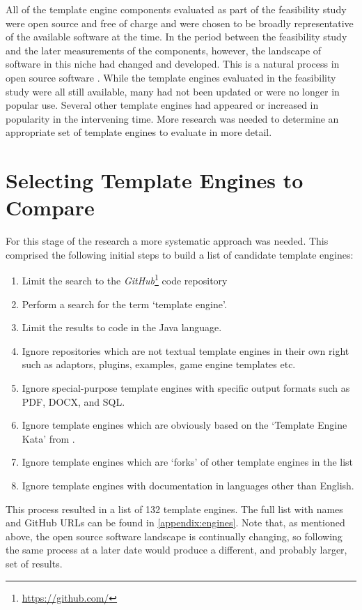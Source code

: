 All of the template engine components evaluated as part of the feasibility study were open source and free of charge and were chosen to be broadly representative of the available software at the time. In the period between the feasibility study and the later measurements of the components, however, the landscape of software in this niche had changed and developed. This is a natural process in open source software \citep{Sonatype2023} \citep{Xie2009}. While the template engines evaluated in the feasibility study were all still available, many had not been updated or were no longer in popular use. Several other template engines had appeared or increased in popularity in the intervening time. More research was needed to determine an appropriate set of template engines to evaluate in more detail.

\section{Selecting Template Engines to Compare}
\label{section:comp:selecting}

For this stage of the research a more systematic approach was needed. This comprised the following initial steps to build a list of candidate template engines:

\begin{enumerate}
    \parsep
    \item Limit the search to the \emph{GitHub}\footnote{\url{https://github.com/}} code repository
    \item Perform a search for the term `template engine'.
    \item Limit the results to code in the Java language.
    \item Ignore repositories which are not textual template engines in their own right such as adaptors, plugins, examples, game engine templates etc.
    \item Ignore special-purpose template engines with specific output formats such as PDF, DOCX, and SQL.
    \item Ignore template engines which are obviously based on the `Template Engine Kata' from \citet{Koskela2007}.
    \item Ignore template engines which are `forks' of other template engines in the list
    \item Ignore template engines with documentation in languages other than English.
\end{enumerate}

This process resulted in a list of 132 template engines. The full list with names and GitHub URLs can be found in \autoref{appendix:engines}. Note that, as mentioned above, the open source software landscape is continually changing, so following the same process at a later date would produce a different, and probably larger, set of results.

